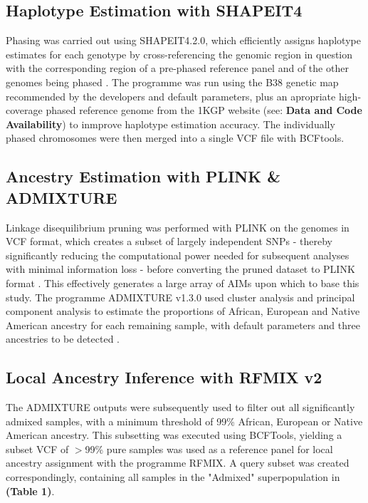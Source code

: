 \documentclass[11pt]{article}
\begin{document}
\subsection{Haplotype Estimation with SHAPEIT4}


Phasing was carried out using SHAPEIT4.2.0, which efficiently assigns haplotype estimates for each genotype by cross-referencing the genomic region in question with the corresponding region of a pre-phased reference panel and of the other genomes being phased \parencite{Delaneau2019}. The programme was run using the B38 genetic map recommended by the developers and default parameters, plus an apropriate high-coverage phased reference genome from the 1KGP website (see: \textbf{Data and Code Availability}) to inmprove haplotype estimation accuracy. The individually phased chromosomes were then merged into a single VCF file with BCFtools. 





\subsection{Ancestry Estimation with PLINK \& ADMIXTURE}


Linkage disequilibrium pruning was performed with PLINK on the genomes in VCF format, which creates a subset of largely independent SNPs - thereby significantly reducing the computational power needed for subsequent analyses with minimal information loss - before converting the pruned dataset to PLINK format \parencite{Purcell2007}. This effectively generates a large array of AIMs upon which to base this study.
The programme ADMIXTURE v1.3.0 used cluster analysis and principal component analysis to estimate the proportions of African, European and Native American ancestry for each remaining sample, with default parameters and three ancestries to be detected \parencite{Alexander2009}.





\subsection{Local Ancestry Inference with RFMIX v2}


The ADMIXTURE outputs were subsequently used to filter out all significantly admixed samples, with a minimum threshold of 99\% African, European or Native American ancestry. This subsetting was executed using BCFTools, yielding a subset VCF of $>$99\% pure samples was used as a reference panel for local ancestry assignment with the programme RFMIX. A query subset was created correspondingly, containing all samples in the "Admixed" superpopulation in \textbf{(Table 1)}.
\end{document}
